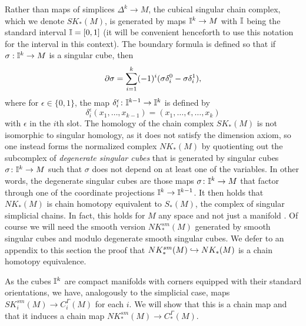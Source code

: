 Rather than maps of simplices $\Delta^k \to M$, the cubical singular chain complex, which we denote $SK_*(M)$, is generated by maps $\mathbb{I}^k \to M$ with $\mathbb{I}$ being the standard interval $\mathbb{I} = [0,1]$ (it will be convenient henceforth to use this notation for the interval in this context).
The boundary formula is defined so that if $\sigma: \mathbb{I}^k \to M$ is a singular cube, then
\begin{equation}\label{E: cube bd}
	\partial \sigma = \sum_{i = 1}^k (-1)^i(\sigma \delta_i^0-\sigma \delta^1_i),
\end{equation}
where for $\epsilon\in\{0,1\}$, the map $\delta_i^\epsilon \colon \mathbb{I}^{k-1} \to \mathbb{I}^k$ is defined by
$$\delta_i^\epsilon(x_1,\ldots,x_{k-1}) = (x_1,\ldots,\epsilon,\ldots, x_k)$$
with $\epsilon$ in the $i$th slot.
The homology of the chain complex $SK_*(M)$ is not isomorphic to singular homology, as it does not satisfy the dimension axiom, so one instead forms the normalized complex $NK_*(M)$ by quotienting out the subcomplex of \textit{degenerate singular cubes} that is generated by singular cubes $\sigma \colon \mathbb{I}^k \to M$ such that $\sigma$ does not depend on at least one of the variables.
In other words, the degenerate singular cubes are those maps $\sigma \colon \mathbb{I}^k \to M$ that factor through one of the coordinate projections $\mathbb{I}^k \to \mathbb{I}^{k-1}$.
It then holds that $NK_*(M)$ is chain homotopy equivalent to $S_*(M)$, the complex of singular simplicial chains.
In fact, this holds for $M$ any space and not just a manifold \cite[Theorem 8.4.7]{HW60}.
Of course we will need the smooth version $NK^{sm}_*(M)$ generated by smooth singular cubes and modulo degenerate smooth singular cubes.
We defer to an appendix to this section the proof that $NK^{sm}_*(M) \hookrightarrow NK_*(M)$ is a chain homotopy equivalence.

As the cubes $\mathbb{I}^k$ are compact manifolds with corners equipped with their standard orientations,
we have, analogously to the simplicial case, maps $SK^{sm}_i(M) \to C_i^\Gamma(M)$ for each $i$.
We will show that this is a chain map and that it induces a chain map $NK^{sm}_*(M) \to C_*^\Gamma(M)$.




